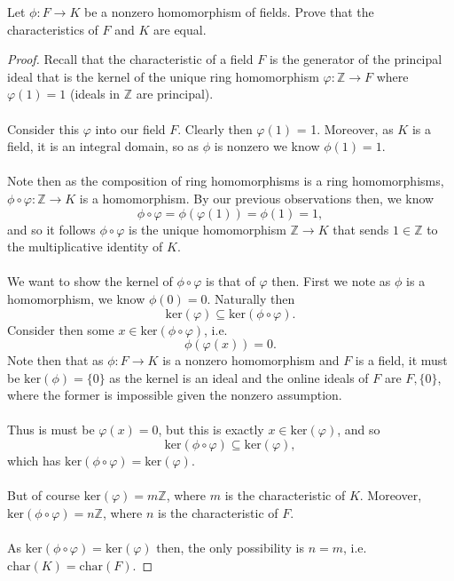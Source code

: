 \documentclass[12pt]{article}
\newenvironment{ex}[2][Exercise]{\begin{trivlist}
\item[\hskip \labelsep {\bfseries #1}\hskip \labelsep {\bfseries #2.}]}{\end{trivlist}}
\begin{document}
\begin{ex}{3}
    Let $\phi : F \rightarrow K$ be a nonzero homomorphism of fields. Prove that the characteristics of $F$ and $K$ are equal.
    \begin{proof}
        Recall that the characteristic of a field $F$ is the generator of the principal ideal that is the kernel of the unique ring homomorphism $\varphi : \mathbb{Z} \rightarrow F$ where $\varphi(1) = 1$ (ideals in $\mathbb{Z}$ are principal). \\ \\
        Consider this $\varphi$ into our field $F$. Clearly then $\varphi(1)$ = 1. Moreover, as $K$ is a field, it is an integral domain, so as $\phi$ is nonzero we know $\phi(1) = 1$. \\ \\
        Note then as the composition of ring homomorphisms is a ring homomorphisms, $\phi \circ \varphi : \mathbb{Z} \rightarrow K$ is a homomorphism. By our previous observations then, we know 
        $$\phi \circ \varphi = \phi(\varphi(1)) = \phi(1) = 1,$$
        and so it follows $\phi \circ \varphi$ is the unique homomorphism $\mathbb{Z} \rightarrow K$ that sends $1 \in \mathbb{Z}$ to the multiplicative identity of $K$. \\ \\
        We want to show the kernel of $\phi \circ \varphi$ is that of $\varphi$ then. First we note as $\phi$ is a homomorphism, we know $\phi(0) = 0$. Naturally then 
        $$\text{ker}(\varphi) \subseteq \text{ker}(\phi \circ \varphi).$$
        Consider then some $x \in \text{ker}(\phi \circ \varphi)$, i.e. 
        $$\phi(\varphi(x)) = 0.$$
        Note then that as $\phi : F \rightarrow K$ is a nonzero homomorphism and $F$ is a field, it must be $\text{ker}(\phi) = \{0\}$ as the kernel is an ideal and the online ideals of $F$ are $F, \{0\}$, where the former is impossible given the nonzero assumption. \\ \\
        Thus is must be $\varphi(x) = 0$, but this is exactly $x \in \text{ker}(\varphi)$, and so 
        $$\text{ker}(\phi \circ \varphi) \subseteq \text{ker}(\varphi),$$
        which has $\text{ker}(\phi \circ \varphi) = \text{ker}(\varphi)$. \\ \\
        But of course $\text{ker}(\varphi) = m\mathbb{Z}$, where $m$ is the characteristic of $K$. Moreover, $\text{ker}(\phi \circ \varphi) = n\mathbb{Z}$, where $n$ is the characteristic of $F$. \\ \\
        As $\text{ker}(\phi \circ \varphi) = \text{ker}(\varphi)$ then, the only possibility is $n = m$, i.e. $\text{char}(K) = \text{char}(F)$.
    \end{proof}
\end{ex}
\end{document}
